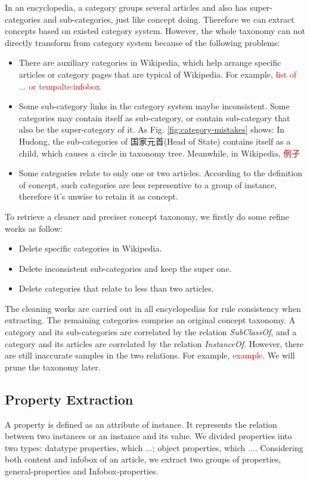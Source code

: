 \documentclass[runningheads,a4paper]{llncs}
\begin{document}
In an encyclopedia, a category groups several articles and also has super-categories and sub-categories, just like concept doing. Therefore we can extract concepts based on existed category system. 
However, the whole taxonomy can not directly transform from category system because of the following problems:
\begin{itemize}
    \item There are auxiliary categories in Wikipedia, which help arrange specific articles or category pages that are typical of Wikipedia. For example, \textcolor{red}{list of ... or tempalte:infobox}
    \item Some sub-category links in the category system maybe inconsistent. Some categories may contain itself as sub-category, or contain sub-category that also be the super-category of it. As Fig. \ref{fig:category-mistakes} shows: In Hudong, the sub-categories of 国家元首(Head of State) contains itself as a child, which causes a circle in taxonomy tree. Meanwhile, in Wikipedia, \textcolor{red}{例子}
    \item Some categories relate to only one or two articles. According to the definition of concept, such categories are less representive to a group of instance, therefore it's unwise to retain it as concept.
\end{itemize}
   To retrieve a cleaner and preciser concept taxonomy, we firstly do some refine works as follow:
\begin{itemize}
    \item Delete specific categories in Wikipedia.
    \item Delete inconsistent sub-categories and keep the super one.
    \item Delete categories that relate to less than two articles.
\end{itemize}
The cleaning works are carried out in all encyclopedias for rule consistency when extracting. The remaining categories comprise an original concept taxonomy. A category and its sub-categories are correlated by the relation \emph{SubClassOf}, and a category and its articles are correlated by the relation \emph{InstanceOf}. However, there are still inaccurate samples in the two relations. For example, \textcolor{red}{example}. We will prune the taxonomy later.

\subsection{Property Extraction}
\label{sec:pe}
A property is defined as an attribute of instance. It represents the relation between two instances or an instance and its value. We divided properties into two types: datatype properties, which \textcolor{red}{...}; object properties, which \textcolor{red}{...}. Considering both content and infobox of an article, we extract two groups of properties, general-properties and Infobox-properties.
\end{document}
